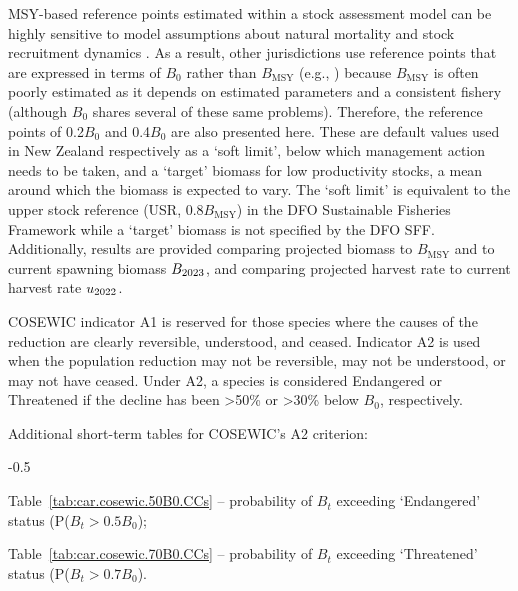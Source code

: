 \documentclass[11pt]{book}
\newcommand{\Bmsy}{B_\text{MSY}}
\newcommand{\pc}{\%}
\begin{document}
MSY-based reference points estimated within a stock assessment model can be highly sensitive to model assumptions about natural mortality and stock recruitment dynamics \citep{Forrest-etal:2018}.
As a result, other jurisdictions use reference points that are expressed in terms of $B_0$ rather than $\Bmsy$ (e.g., \citealt{NZMF:2011}) because $\Bmsy$ is often poorly estimated as it depends on estimated parameters and a consistent fishery (although $B_0$ shares several of these same problems).
Therefore, the reference points of 0.2$B_0$ and 0.4$B_0$ are also presented here.
These are default values used in New Zealand respectively as a `soft limit', below which management action needs to be taken, and a `target' biomass for low productivity stocks, a mean around which the biomass is expected to vary.
The `soft limit' is equivalent to the upper stock reference (USR, 0.8$\Bmsy$) in the DFO Sustainable Fisheries Framework while a `target' biomass is not specified by the DFO SFF.
Additionally, results are provided comparing projected biomass to $\Bmsy$ and to current spawning biomass $B_{2023}$, and comparing projected harvest rate to current harvest rate $u_{2022}$.

COSEWIC indicator A1 is reserved for those species where the causes of the reduction are clearly reversible, understood, and ceased.
Indicator A2 is used when the population reduction may not be reversible, may not be understood, or may not have ceased.
Under A2, a species is considered Endangered or Threatened if the decline has been >50\pc{} or >30\pc{} below $B_0$, respectively.

Additional short-term tables for COSEWIC's A2 criterion:
\begin{itemize_csas}{-0.5}{}
\item Table~\ref{tab:car.cosewic.50B0.CCs}  -- probability of $B_t$ exceeding `Endangered' status (P($B_t > 0.5B_0$);
\item Table~\ref{tab:car.cosewic.70B0.CCs}  -- probability of $B_t$ exceeding `Threatened' status (P($B_t > 0.7B_0$).
\end{itemize_csas}
\end{document}
